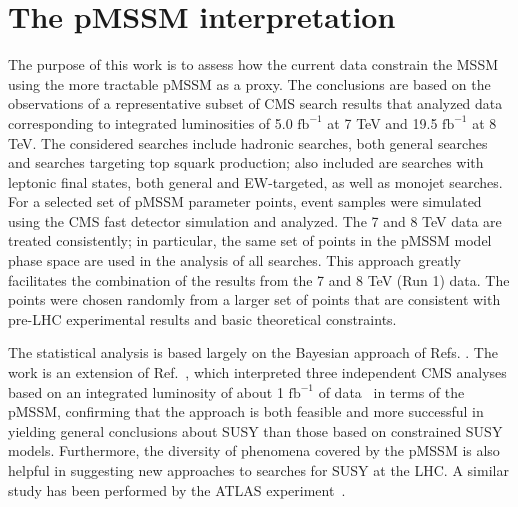 \section{The pMSSM interpretation}
The purpose of this work is to assess how the current data constrain the MSSM using the more tractable pMSSM as a proxy.  The conclusions are based on the observations of a representative subset of CMS search results that analyzed data corresponding to  integrated
luminosities of 5.0 $\text{fb}^{-1}$ at 7 TeV and  19.5 $\text{fb}^{-1}$ at 8 TeV.
The considered searches include hadronic searches, both general searches and searches
targeting top squark production; also included are searches with
leptonic final states, both general and EW-targeted, as well as monojet searches. For a selected set of pMSSM parameter points, event samples were simulated using the CMS fast detector simulation \cite{fastsim} and analyzed. 
The 7 and 8 TeV data are treated consistently; in particular, the same set of points in the pMSSM model phase space are used in the analysis of all searches. This approach greatly facilitates the combination of the results from the 7 and 8 TeV (Run 1) data. The points were chosen randomly from a larger set of points that are consistent with pre-LHC experimental results and basic theoretical constraints.

The statistical analysis is based largely on the Bayesian approach of Refs. \cite{Bayes:1, Bayes:2}. The work is an extension of Ref.~\cite{Sekmen:2011cz}, which interpreted three independent CMS
analyses based on an integrated luminosity of about 1 $\text{fb}^{-1}$ of
data~\cite{Chatrchyan:2011zy,Chatrchyan:2011gqa,Chatrchyan:2012te} in
terms of the pMSSM, confirming that the approach is both feasible and
more successful in yielding general conclusions about SUSY than those based on constrained SUSY models.
Furthermore, the diversity of phenomena covered by the pMSSM is also helpful
in suggesting new approaches to searches for SUSY at the LHC. A similar study has been performed by the ATLAS experiment~\cite{Aad:2015baa}.


